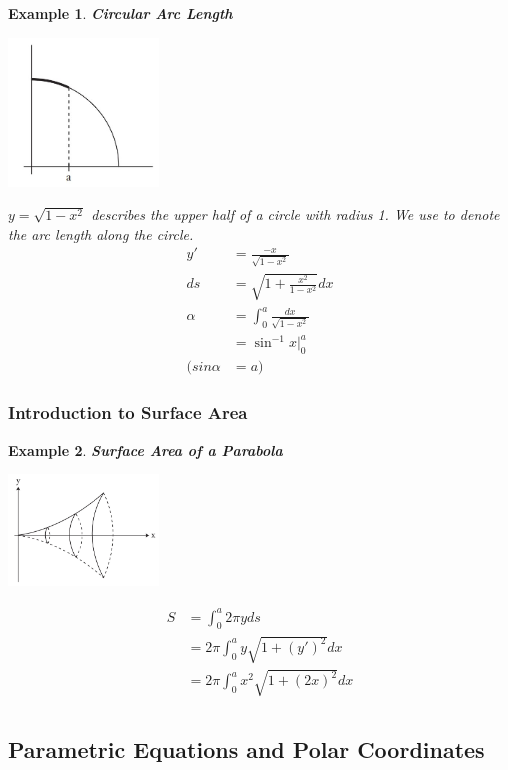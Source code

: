 \documentclass[10pt, a4paper]{article}
\newtheorem{example}{Example}
\begin{document}
\begin{example}
    \textbf{Circular Arc Length} \\
    \begin{center}
        \includegraphics[width=0.3\textwidth]{arc length.jpg}
    \end{center}
    $y= \sqrt{1-x^2}$ describes the upper half of a circle with radius 1. We use \alpha to denote the arc length along the circle.
    \begin{align*}
        y' &= \frac{-x}{\sqrt{1-x^2}} \\
        ds &= \sqrt{1 + \frac{x^2}{1-x^2}}dx \\
        \alpha &= \int_{0}^{a} \frac{dx}{\sqrt{1-x^2}} \\
        &= \sin^{-1} x \Big|_{0}^{a} \\
        (sin \alpha &= a)
    \end{align*}
\end{example}

\subsubsection*{Introduction to Surface Area}
\begin{example}
    \textbf{Surface Area of a Parabola} \\
    \begin{center}
        \includegraphics[width=0.3\textwidth]{parabola rotation.jpg}
    \end{center}
    \begin{align*}
        S &= \int_{0}^{a} 2 \pi y ds \\
        &= 2 \pi \int_{0}^{a} y \sqrt{1 + (y')^2} dx \\
        &= 2 \pi \int_{0}^{a} x^2 \sqrt{1 + (2x)^2} dx \\
    \end{align*}
\end{example}



\subsection{Parametric Equations and Polar Coordinates}
\end{document}
